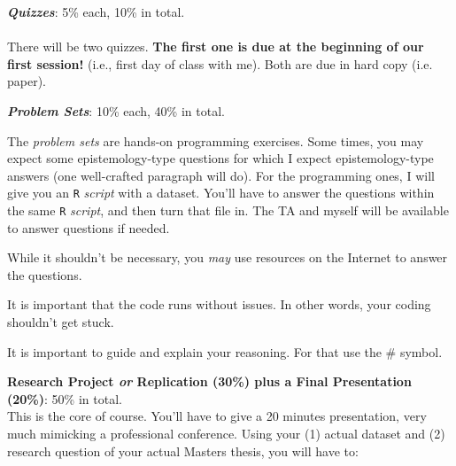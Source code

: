 \documentclass[letterpaper]{article}
\renewenvironment{itemize}{
  \begin{list}{}{
    \setlength{\leftmargin}{1.5em}
  }
}{
  \end{list}
}
\begin{document}
\begin{enumerate}

	\item {\bf \emph{Quizzes}}: 5\% each, 10\% in total.
	\\
  \\
   There will be two quizzes. {\bf The first one is due at the beginning of our first session!} (i.e., first day of class with me). Both are due in hard copy (i.e. paper). 

	\item {\bf \emph{Problem Sets}}: 10\% each, 40\% in total.

The \emph{problem sets} are hands-on programming exercises. Some times, you may expect some epistemology-type questions for which I expect epistemology-type answers (one well-crafted paragraph will do). For the programming ones, I will give you an \texttt{R} \emph{script} with a dataset. You'll have to answer the questions within the same \texttt{R} \emph{script}, and then turn that file in. The TA and myself will be available to answer questions if needed. 

\begin{itemize}
		\item[$\diamond$] While it shouldn't be necessary, you \emph{may} use resources on the Internet to answer the questions.
		\item[$\diamond$] It is important that the code runs without issues. In other words, your coding shouldn't get stuck.
		\item[$\diamond$] It is important to guide and explain your reasoning. For that use the \# symbol.
\end{itemize}


\item {\bf Research Project \emph{or} Replication (30\%) plus a Final Presentation (20\%)}: 50\% in total.\\

This is the core of course. You'll have to give a 20 minutes presentation, very much mimicking a professional conference. Using your (1) actual dataset and (2) research question of your actual Masters thesis, you will have to:

\begin{itemize}


\end{itemize}
\end{enumerate}
\end{document}
